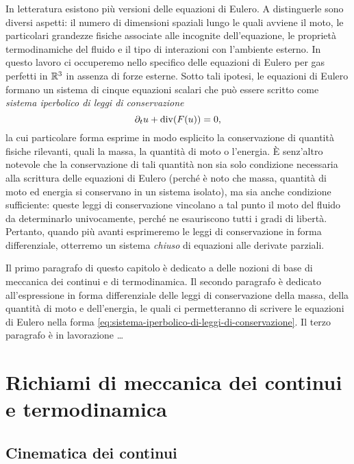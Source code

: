 In letteratura esistono più versioni delle equazioni di Eulero.
A distinguerle sono diversi aspetti:
il numero di dimensioni spaziali lungo le quali avviene il moto,
le particolari grandezze fisiche associate alle incognite dell'equazione,
le proprietà termodinamiche del fluido
e il tipo di interazioni con l'ambiente esterno.
In questo lavoro ci occuperemo nello specifico delle
equazioni di Eulero per gas perfetti in $\mathbb{R}^3$ in assenza di forze esterne.
Sotto tali ipotesi, le equazioni di Eulero formano un sistema di
cinque equazioni scalari che può essere scritto come
\emph{sistema iperbolico di leggi di conservazione}
\begin{equation} \label{eq:sistema-iperbolico-di-leggi-di-conservazione}
\partial_t u + \operatorname{div}(F(u)) = 0,
\end{equation}
la cui particolare forma esprime in modo esplicito
la conservazione di quantità fisiche rilevanti,
quali la massa, la quantità di moto o l'energia.
È senz'altro notevole che la conservazione di tali quantità
non sia solo condizione necessaria alla scrittura delle equazioni
di Eulero (perché è noto che massa, quantità di moto
ed energia si conservano in un sistema isolato),
ma sia anche condizione sufficiente: queste leggi
di conservazione vincolano a tal punto il moto del fluido
da determinarlo univocamente, perché ne esauriscono tutti i gradi
di libertà.
Pertanto, quando più avanti esprimeremo le leggi di conservazione
in forma differenziale, otterremo un sistema \emph{chiuso} di equazioni
alle derivate parziali.

Il primo paragrafo di questo capitolo è dedicato a delle nozioni di base
di meccanica dei continui e di termodinamica.
Il secondo paragrafo è dedicato all'espressione in forma differenziale
delle leggi di conservazione della massa, della quantità di moto e
dell'energia, le quali ci permetteranno di scrivere le equazioni di Eulero
nella forma \eqref{eq:sistema-iperbolico-di-leggi-di-conservazione}.
Il terzo paragrafo è in lavorazione \dots

\section{Richiami di meccanica dei continui e termodinamica}

\subsection*{Cinematica dei continui}

